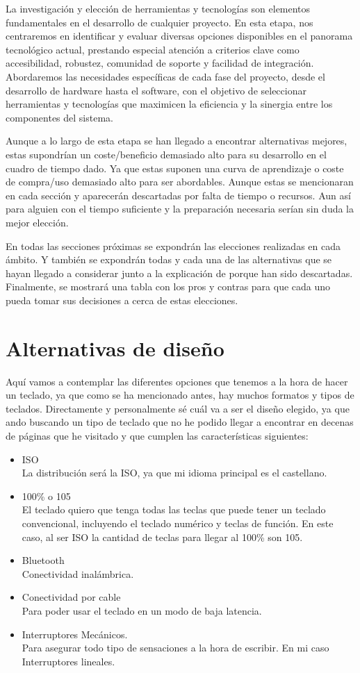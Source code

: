 La investigación y elección de herramientas y tecnologías son elementos fundamentales en el desarrollo de cualquier proyecto. En esta etapa, nos centraremos en identificar y evaluar diversas opciones disponibles en el panorama tecnológico actual, prestando especial atención a criterios clave como accesibilidad, robustez, comunidad de soporte y facilidad de integración. Abordaremos las necesidades específicas de cada fase del proyecto, desde el desarrollo de hardware hasta el software, con el objetivo de seleccionar herramientas y tecnologías que maximicen la eficiencia y la sinergia entre los componentes del sistema.

Aunque a lo largo de esta etapa se han llegado a encontrar alternativas mejores, estas supondrían un coste/beneficio demasiado alto para su desarrollo en el cuadro de tiempo dado.
Ya que estas suponen una curva de aprendizaje o coste de compra/uso demasiado alto para ser abordables. Aunque estas se mencionaran en cada sección y aparecerán descartadas por falta de tiempo o recursos. Aun así para alguien con el tiempo suficiente y la preparación necesaria serían sin duda la mejor elección.

En todas las secciones próximas se expondrán las elecciones realizadas en cada ámbito. Y también se expondrán todas y cada una de las alternativas que se hayan llegado a considerar junto a la explicación de porque han sido descartadas. Finalmente, se mostrará una tabla con los pros y contras para que cada uno pueda tomar sus decisiones a cerca de estas elecciones.

\section{Alternativas de diseño}
Aquí vamos a contemplar las diferentes opciones que tenemos a la hora de hacer un teclado, ya que como se ha mencionado antes, hay muchos formatos y tipos de teclados. Directamente y personalmente sé cuál va a ser el diseño elegido, ya que ando buscando un tipo de teclado que no he podido llegar a encontrar en decenas de páginas  que he visitado y que cumplen las características siguientes:
\begin{itemize}
\item \gls{ISO} \\ La distribución será la \gls{ISO}, ya que mi idioma principal es el castellano.
\item 100\% o 105 \\ El teclado quiero que tenga todas las teclas que puede tener un teclado convencional, incluyendo el teclado numérico y teclas de función. En este caso, al ser \gls{ISO} la cantidad de teclas para llegar al 100\% son 105.
\item \gls{Bluetooth} \\ Conectividad inalámbrica.
\item Conectividad por cable \\ Para poder usar el teclado en un modo de baja latencia.
\item Interruptores Mecánicos. \\ Para asegurar todo tipo de sensaciones a la hora de escribir. En mi caso Interruptores lineales.
\end{itemize}

